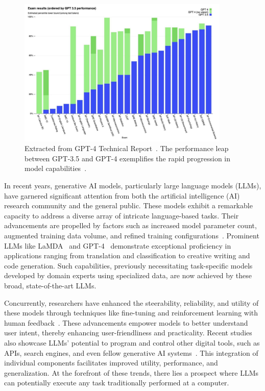 \documentclass[12pt]{extarticle}
\begin{document}
\begin{figure}[h!]
    \centering
    \includegraphics[width=0.90\textwidth]{img/gpt4_technical_report.jpg}
    \caption{Extracted from GPT-4 Technical Report~\cite{openai2023gpt4}. The performance leap between GPT-3.5 and GPT-4 exemplifies the rapid progression in model capabilities~\cite{openai2023gpt4}.}\label{fig:gpt4_technical_report}
\end{figure}

In recent years, generative AI models, particularly large language models (LLMs), have garnered significant attention from both the artificial intelligence (AI) research community and the general public. These models exhibit a remarkable capacity to address a diverse array of intricate language-based tasks. Their advancements are propelled by factors such as increased model parameter count, augmented training data volume, and refined training configurations~\cite{brown2020language, radford2019language, hernandez2021scaling, kaplan2020scaling}. Prominent LLMs like LaMDA~\cite{thoppilan2022lamda} and GPT-4~\cite{openai2023gpt4} demonstrate exceptional proficiency in applications ranging from translation and classification to creative writing and code generation. Such capabilities, previously necessitating task-specific models developed by domain experts using specialized data, are now achieved by these broad, state-of-the-art LLMs.

Concurrently, researchers have enhanced the steerability, reliability, and utility of these models through techniques like fine-tuning and reinforcement learning with human feedback~\cite{ouyang2022training, bai2022training}. These advancements empower models to better understand user intent, thereby enhancing user-friendliness and practicality. Recent studies also showcase LLMs' potential to program and control other digital tools, such as APIs, search engines, and even fellow generative AI systems~\cite{schick2023toolformer, mialon2023augmented}. This integration of individual components facilitates improved utility, performance, and generalization. At the forefront of these trends, there lies a prospect where LLMs can potentially execute any task traditionally performed at a computer.
\end{document}
